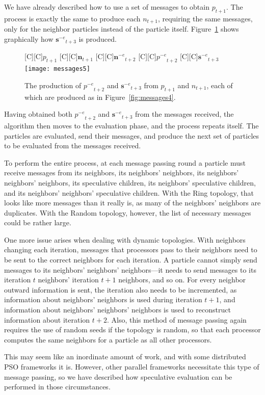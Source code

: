 \documentclass[journal,letterpaper]{IEEEtran}
\newcommand{\fig}[1]{Figure~\ref{fig:#1}}
\providecommand{\noeval}[1]{\ensuremath{#1^{-e}}}
\providecommand{\p}{\ensuremath{p}}
\providecommand{\sset}{\ensuremath{\mathbf{s}}}
\providecommand{\n}{\ensuremath{n}}
\providecommand{\nset}{\ensuremath{\mathbf{n}}}
\begin{document}
We have already described how to use a set of messages to obtain $\p_{t+1}$.
The process is exactly the same to produce each $\n_{t+1}$, requiring the same
messages, only for the neighbor particles instead of the particle itself.
\fig{messages5} shows graphically how $\noeval{\sset}_{t+3}$ is produced.

\begin{figure}
  \centering
  [C][C]{$\p_{t+1}$}
  [C][C]{$\nset_{t+1}$}
  [C][C]{$\noeval{\nset}_{t+2}$}
  [C][C]{$\noeval{\p}_{t+2}$}
  [C][C]{$\noeval{\sset}_{t+3}$}
  \texttt{[image: messages5]}
  \caption{The production of $\noeval{\p}_{t+2}$ and $\noeval{\sset}_{t+3}$
  from $\p_{t+1}$ and $\n_{t+1}$, each of which are produced as in
  \fig{messages4}.}
  \label{fig:messages5}
\end{figure}

Having obtained both $\noeval{\p}_{t+2}$ and $\noeval{\sset}_{t+3}$ from the
messages received, the algorithm then moves to the evaluation phase, and the
process repeats itself.  The particles are evaluated, send their messages, and
produce the next set of particles to be evaluated from the messages received.

To perform the entire process, at each message passing round a particle must
receive messages from its neighbors, its neighbors' neighbors, its neighbors'
neighbors' neighbors, its speculative children, its neighbors' speculative
children, and its neighbors' neighbors' speculative children.  With the Ring
topology, that looks like more messages than it really is, as many of the
neighbors' neighbors are duplicates.  With the Random topology, however, the
list of necessary messages could be rather large.  

One more issue arises when dealing with dynamic topologies.  With neighbors
changing each iteration, messages that processors pass to their neighbors need
to be sent to the correct neighbors for each iteration.  A particle cannot
simply send messages to its neighbors' neighbors' neighbors---it needs to send
messages to its iteration $t$ neighbors' iteration $t+1$ neighbors, and so on.
For every neighbor outward information is sent, the iteration also needs to be
incremented, as information about neighbors' neighbors is used during iteration
$t+1$, and information about neighbors' neighbors' neighbors is used to
reconstruct information about iteration $t+2$.  Also, this method of message
passing again requires the use of random seeds if the topology is random, so
that each processor computes the same neighbors for a particle as all other
processors.

This may seem like an inordinate amount of work, and with some distributed PSO
frameworks it is.  However, other parallel frameworks necessitate this type of
message passing, so we have described how speculative evaluation can be
performed in those circumstances.




\end{document}
